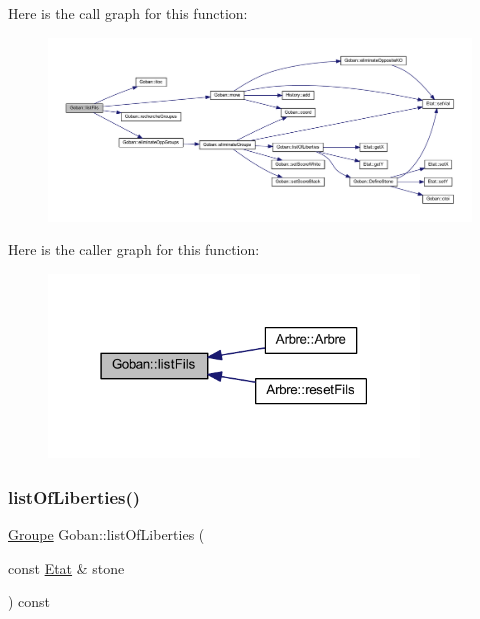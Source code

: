 Here is the call graph for this function\+:
\nopagebreak
\begin{figure}[H]
\begin{center}
\leavevmode
\includegraphics[width=350pt]{class_goban_a36ab256c9430e070b620052a0f13f051_cgraph}
\end{center}
\end{figure}
Here is the caller graph for this function\+:
\nopagebreak
\begin{figure}[H]
\begin{center}
\leavevmode
\includegraphics[width=279pt]{class_goban_a36ab256c9430e070b620052a0f13f051_icgraph}
\end{center}
\end{figure}
\mbox{\label{class_goban_a84f36324eb9ddc29f522d481f04c13e7}} 
\subsubsection{\texorpdfstring{list\+Of\+Liberties()}{listOfLiberties()}}
{\footnotesize\ttfamily \hyperlink{class_groupe}{Groupe} Goban\+::list\+Of\+Liberties (\begin{DoxyParamCaption}\item[{const \hyperlink{class_etat}{Etat} \&}]{stone }\end{DoxyParamCaption}) const}

